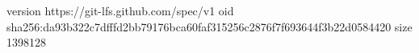 version https://git-lfs.github.com/spec/v1
oid sha256:da93b322c7dfffd2bb79176bca60faf315256c2876f7f693644f3b22d0584420
size 1398128
